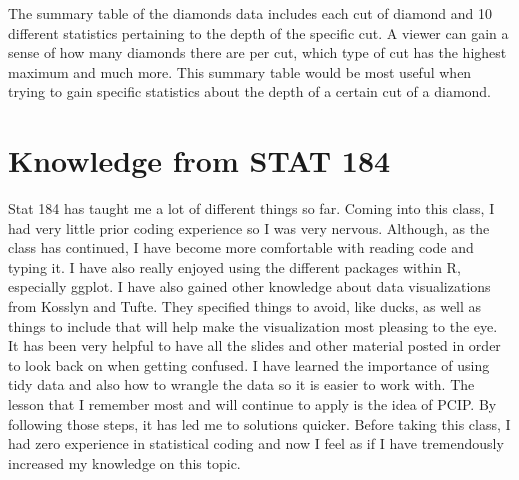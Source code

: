 \documentclass[
]{article}
\begin{document}
The summary table of the diamonds data includes each cut of diamond and
10 different statistics pertaining to the depth of the specific cut. A
viewer can gain a sense of how many diamonds there are per cut, which
type of cut has the highest maximum and much more. This summary table
would be most useful when trying to gain specific statistics about the
depth of a certain cut of a diamond.

\hypertarget{knowledge-from-stat-184}{%
\section{Knowledge from STAT 184}\label{knowledge-from-stat-184}}

Stat 184 has taught me a lot of different things so far. Coming into
this class, I had very little prior coding experience so I was very
nervous. Although, as the class has continued, I have become more
comfortable with reading code and typing it. I have also really enjoyed
using the different packages within R, especially ggplot. I have also
gained other knowledge about data visualizations from Kosslyn and Tufte.
They specified things to avoid, like ducks, as well as things to include
that will help make the visualization most pleasing to the eye. It has
been very helpful to have all the slides and other material posted in
order to look back on when getting confused. I have learned the
importance of using tidy data and also how to wrangle the data so it is
easier to work with. The lesson that I remember most and will continue
to apply is the idea of PCIP. By following those steps, it has led me to
solutions quicker. Before taking this class, I had zero experience in
statistical coding and now I feel as if I have tremendously increased my
knowledge on this topic.
\end{document}
